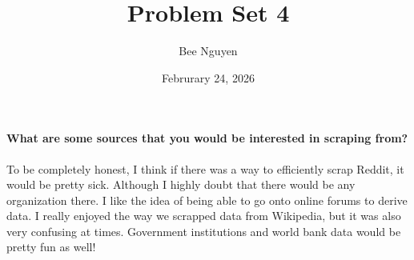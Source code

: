 \documentclass{article}
\title{Problem Set 4}
\author{Bee Nguyen}
\date{Februrary 24, 2026}
\begin{document}
\maketitle

\paragraph{What are some sources that you would be interested in scraping from?}

\hspace{3pt}

To be completely honest, I think if there was a way to efficiently scrap Reddit, it would be pretty sick. Although I highly doubt that there would be any organization there. I like the idea of being able to go onto online forums to derive data. I really enjoyed the way we scrapped data from Wikipedia, but it was also very confusing at times. Government institutions and world bank data would be pretty fun as well!
\end{document}

